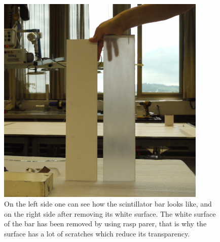 \documentclass[a4paper]{article}\linespread{1.4}
\begin{document}
\begin{figure}[h!] \centering \includegraphics[width=100mm,scale=1.0]{trapaint.png} \caption{On the left side one can see how the scintillator bar looks like, and on the right side after removing its white surface. The white surface of the bar has been removed by using rasp parer, that is why the surface has a lot of scratches which reduce its transparency.} \label{fig:trans} \end{figure}  
\end{document}
